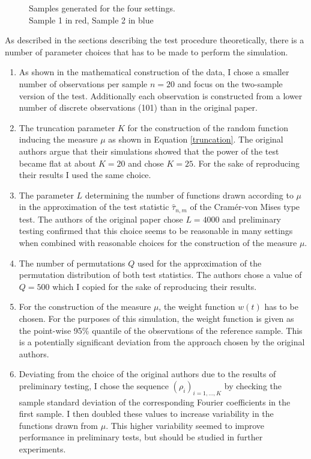 \documentclass[12pt, a4paper]{article}
\theoremstyle{MAstyle} \newtheorem{assumption}{Assumption}[section]
\theoremstyle{MAstyle} \newtheorem{definition}{Definition}[section]
\theoremstyle{MAstyle} \newtheorem{theorem}{Theorem}[section]
\begin{document}
		\begin{figure}[H]
			\caption{Samples generated for the four settings. \\
			Sample 1 in red, Sample 2 in blue}
			\label{settings}
		\end{figure}
		As described in the sections describing the test procedure theoretically, there is a number of parameter choices that has to be made to perform the simulation.
		\begin{enumerate}
			\item As shown in the mathematical construction of the data, I chose a smaller number of observations per sample $n=20$ and focus on the two-sample version of the test. Additionally each observation is constructed from a lower number of discrete observations (101) than in the original paper.
			\item The truncation parameter $K$ for the construction of the random function inducing the measure $\mu$ as shown in Equation \ref{truncation}. The original authors argue that their simulations showed that the power of the test became flat at about $K = 20$ and chose $K = 25$. For the sake of reproducing their results I used the same choice.
			\item The parameter $L$ determining the number of functions drawn according to $\mu$ in the approximation of the test statistic $\hat{\tau}_{n,m}$ of the Cram\'{e}r-von Mises type test. The authors of the original paper chose $L = 4000$ and preliminary testing confirmed that this choice seems to be reasonable in many settings when combined with reasonable choices for the construction of the measure $\mu$.
			\item The number of permutations $Q$ used for the approximation of the permutation distribution of both test statistics. The authors chose a value of $Q = 500$ which I copied for the sake of reproducing their results.
			\item For the construction of the measure $\mu$, the weight function $w(t)$ has to be chosen. For the purposes of this simulation, the weight function is given as the point-wise 95\% quantile of the observations of the reference sample. This is a potentially significant deviation from the approach chosen by the original authors.
			\item Deviating from the choice of the original authors due to the results of preliminary testing, I chose the sequence $\left(\rho_i\right)_{i = 1, \dots, K}$ by checking the sample standard deviation of the corresponding Fourier coefficients in the first sample. I then doubled these values to increase variability in the functions drawn from $\mu$. This higher variability seemed to improve performance in preliminary tests, but should be studied in further experiments.

\end{enumerate}
\end{document}

